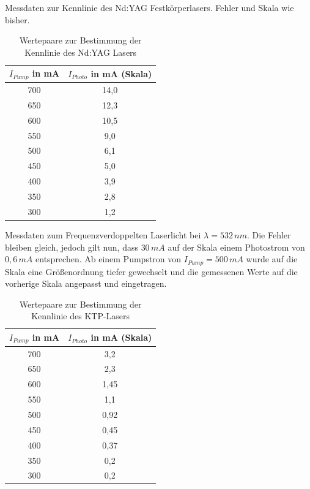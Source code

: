 \documentclass[twoside,colorback,accentcolor=tud4c,11pt]{tudreport}
\begin{document}
Messdaten zur Kennlinie des Nd:YAG Festkörperlasers. Fehler und Skala wie bisher.
\begin{table}[H]
\renewcommand*{\arraystretch}{1.2}
\centering
\begin{tabular}{|c|c|}
\hline 
$I_{Pump}$ in mA & $I_{Photo}$ in mA (Skala)\\
\hline 
700 & 14,0  \\ 
\hline 
650 & 12,3  \\ 
\hline 
600 & 10,5  \\ 
\hline 
550 & 9,0  \\ 
\hline 
500 & 6,1  \\ 
\hline
450 & 5,0 \\ 
\hline
400 & 3,9 \\ 
\hline
350 & 2,8 \\ 
\hline
300 & 1,2 \\ 
\hline
\end{tabular} 
\caption{Wertepaare zur Bestimmung der Kennlinie des Nd:YAG Lasers}\label{kennND}
\end{table}

Messdaten zum Frequenzverdoppelten Laserlicht bei $\lambda =532\,\si{nm}$. Die Fehler bleiben gleich, jedoch gilt nun, dass $30\,\si{mA}$ auf der Skala einem Photostrom von $0,6\,\si{mA}$ entsprechen.
Ab einem Pumpstron von $I_{Pump}=500\,\si{mA}$ wurde auf die Skala eine Größenordnung tiefer gewechselt und die gemessenen Werte auf die vorherige Skala angepasst und eingetragen.
\begin{table}[H]
\renewcommand*{\arraystretch}{1.2}
\centering
\begin{tabular}{|c|c|}
\hline 
$I_{Pump}$ in mA & $I_{Photo}$ in mA (Skala)\\
\hline 
700 & 3,2  \\ 
\hline 
650 & 2,3  \\ 
\hline 
600 & 1,45  \\ 
\hline 
550 & 1,1  \\ 
\hline 
500 & 0,92  \\ 
\hline
450 & 0,45 \\ 
\hline
400 & 0,37 \\ 
\hline
350 & 0,2 \\ 
\hline
300 & 0,2 \\ 
\hline
\end{tabular} 
\caption{Wertepaare zur Bestimmung der Kennlinie des KTP-Lasers}\label{kennktp}
\end{table}
\end{document}
